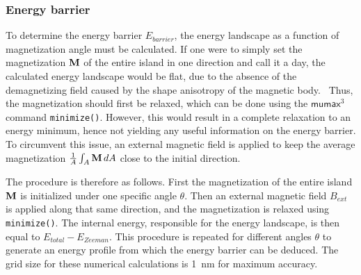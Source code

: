 \documentclass[10pt,a4paper]{article}
\newcommand{\code}[1]{\texttt{#1}}
\newcommand{\mumax}{$\mathsf{mumax}^3$}
\begin{document}
\subsubsection{Energy barrier}
To determine the energy barrier $E_{barrier}$, the energy landscape as a function of magnetization angle must be calculated. If one were to simply set the magnetization $\vb{M}$ of the entire island in one direction and call it a day, the calculated energy landscape would be flat, due to the absence of the demagnetizing field caused by the shape anisotropy of the magnetic body.~\cite{Nonmonotonic_reversal} Thus, the magnetization should first be relaxed, which can be done using the \mumax{} command \code{minimize()}. However, this would result in a complete relaxation to an energy minimum, hence not yielding any useful information on the energy barrier. To circumvent this issue, an external magnetic field is applied to keep the average magnetization $\frac{1}{A}\int_A \vb{M}\,dA$ close to the initial direction. \par
The procedure is therefore as follows. First the magnetization of the entire island $\vb{M}$ is initialized under one specific angle $\theta$. Then an external magnetic field $B_{ext}$ is applied along that same direction, and the magnetization is relaxed using \code{minimize()}. The internal energy, responsible for the energy landscape, is then equal to $E_{total} - E_{Zeeman}$. This procedure is repeated for different angles $\theta$ to generate an energy profile from which the energy barrier can be deduced. The grid size for these numerical calculations is \SI{1}{\nano\metre} for maximum accuracy.
\end{document}
